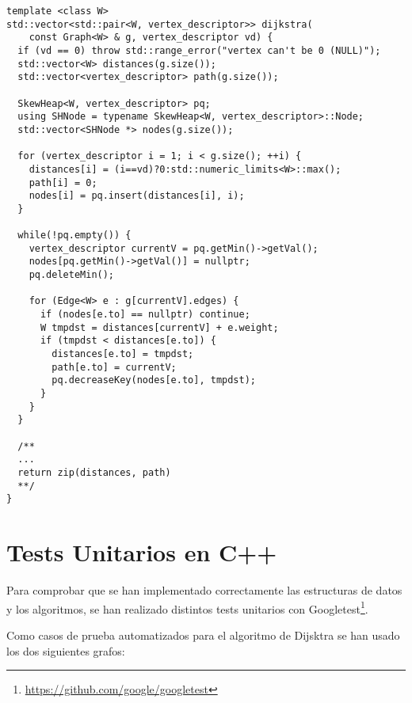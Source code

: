 \documentclass{article}
\begin{document}
\begin{verbatim}
template <class W>
std::vector<std::pair<W, vertex_descriptor>> dijkstra(
	const Graph<W> & g, vertex_descriptor vd) {
  if (vd == 0) throw std::range_error("vertex can't be 0 (NULL)");
  std::vector<W> distances(g.size());
  std::vector<vertex_descriptor> path(g.size());

  SkewHeap<W, vertex_descriptor> pq;
  using SHNode = typename SkewHeap<W, vertex_descriptor>::Node;
  std::vector<SHNode *> nodes(g.size());

  for (vertex_descriptor i = 1; i < g.size(); ++i) {
    distances[i] = (i==vd)?0:std::numeric_limits<W>::max();
    path[i] = 0;
    nodes[i] = pq.insert(distances[i], i);
  }

  while(!pq.empty()) {
    vertex_descriptor currentV = pq.getMin()->getVal();
    nodes[pq.getMin()->getVal()] = nullptr;
    pq.deleteMin();

    for (Edge<W> e : g[currentV].edges) {
      if (nodes[e.to] == nullptr) continue;
      W tmpdst = distances[currentV] + e.weight;
      if (tmpdst < distances[e.to]) {
        distances[e.to] = tmpdst;
        path[e.to] = currentV;
        pq.decreaseKey(nodes[e.to], tmpdst);
      }
    }
  }

  /**
  ...
  return zip(distances, path)
  **/
}
\end{verbatim}

\section{Tests Unitarios en C++}
Para comprobar que se han implementado correctamente las estructuras de datos y los algoritmos, se han realizado distintos tests unitarios con Googletest\footnote{\url{https://github.com/google/googletest}}.

Como casos de prueba automatizados para el algoritmo de Dijsktra se han usado los dos siguientes grafos:

\vspace*{1em}
\noindent\begin{minipage}{.45\textwidth}
\centering
{}
\end{minipage} %
\begin{minipage}{.45\textwidth}
\centering
{}
\end{minipage}
\end{document}
